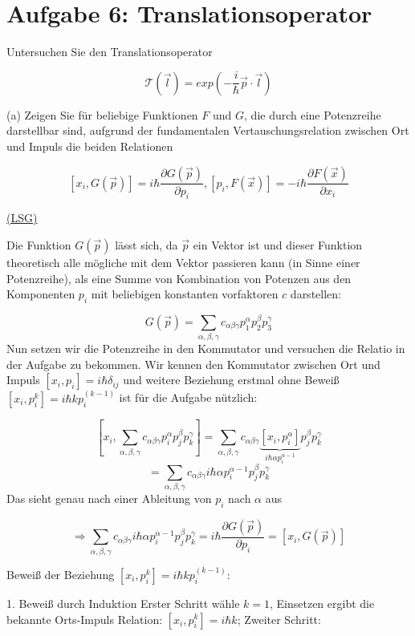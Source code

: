 \documentclass[12pt,a4paper,titlepage,oneside]{report}
\begin{document}
\section{Aufgabe 6: Translationsoperator}

Untersuchen Sie den Translationsoperator

$$ \mathcal T(\vec l) = exp\left( -\frac i \hbar \vec p\cdot \vec l
\right) $$

(a) Zeigen Sie für beliebige Funktionen $F$ und $G$, die durch eine
Potenzreihe darstellbar sind, aufgrund der fundamentalen
Vertauschungsrelation zwischen Ort und Impuls die beiden Relationen

$$ [x_i, G(\vec p)]=i\hbar \frac{\partial G(\vec p)}{\partial p_i}, [p_i,F(\vec x)] = -i\hbar \frac{\partial F(\vec
  x)}{\partial x_i} $$

\underline{(LSG)}

Die Funktion $G(\vec p)$ lässt sich, da $\vec p$ ein Vektor ist und
dieser Funktion theoretisch alle mögliche mit dem Vektor passieren
kann (in Sinne einer Potenzreihe),  als
eine Summe von Kombination von Potenzen aus den Komponenten $p_i$ mit
beliebigen konstanten vorfaktoren $c$ darstellen:

$$  G(\vec p) = \sum_{\alpha,\beta,\gamma}
c_{\alpha\beta\gamma}p^\alpha_1 p^\beta_2 p^\gamma_3$$
Nun setzen wir die Potenzreihe in den Kommutator und versuchen die
Relatio in der Aufgabe zu bekommen. Wir kennen den Kommutator
zwischen Ort und Impuls $[x_i,p_i]=i\hbar\delta_{ij}$ und weitere
Beziehung erstmal ohne Beweiß $[x_i,p_i^k]=i\hbar k p_i^{(k-1)}$ ist für
die Aufgabe nützlich:

$$ [x_i,\sum_{\alpha,\beta,\gamma}
c_{\alpha\beta\gamma}p^\alpha_i p^\beta_j p^\gamma_k] = \sum_{\alpha,\beta,\gamma}
c_{\alpha\beta\gamma}\underbrace{[x_i,p^\alpha_i]}_{i\hbar \alpha
  p^{\alpha-1}_i} p^\beta_j p^\gamma_k$$
$$=  \sum_{\alpha,\beta,\gamma}
c_{\alpha\beta\gamma}i\hbar \alpha p^{\alpha-1}_i p^\beta_j
p^\gamma_k$$
Das sieht genau nach einer Ableitung von $p_i$ nach $\alpha$ aus

$$\Rightarrow \sum_{\alpha,\beta,\gamma}
c_{\alpha\beta\gamma}i\hbar \alpha p^{\alpha-1}_i p^\beta_j
p^\gamma_k =i\hbar \frac{\partial G(\vec p)}{\partial p_i} =  [x_i,
G(\vec p)]$$

Beweiß der Beziehung $[x_i,p_i^k]=i\hbar k p_i^{(k-1)}$:

1. Beweiß durch Induktion
Erster Schritt wähle $k=1$, Einsetzen ergibt die bekannte Orts-Impuls Relation:
$[x_i,p_i^k]=i\hbar k$;  Zweiter Schritt:
\end{document}
